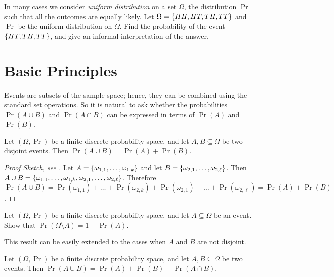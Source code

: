 \begin{exercise}
  In many cases we consider \emph{uniform distribution} on a set $\Omega$, the
  distribution $\Pr$ such that all the outcomes are equally likely.
  Let $\Omega = \set{HH, HT, TH, TT}$ and $\Pr$ be the uniform distribution on
  $\Omega$. Find the probability of the event $\set{HT, TH, TT}$, and give an
  informal interpretation of the answer.
\end{exercise}

\section{Basic Principles}

Events are subsets of the sample space; hence, they can be combined using the
standard set operations. So it is natural to ask whether the probabilities
$\Pr(A \cup B)$ and $\Pr(A \cap B)$ can be expressed in terms of $\Pr(A)$ and
$\Pr(B)$.

\begin{theorem}
  Let $(\Omega, \Pr)$ be a finite discrete probability space, and let $A, B
  \subseteq \Omega$ be two disjoint events. Then 
  $\Pr(A \cup B) = \Pr(A) + \Pr(B)$.
\end{theorem}
\begin{proof}[Proof Sketch, see ]
  Let $A = \set{\omega_{1, 1}, \dots, \omega_{1, k}}$ and 
  let $B = \set{\omega_{2, 1}, \dots, \omega_{2, \ell}}$. 
  Then $A \cup B = \set{\omega_{1, 1}, \dots, \omega_{1, k}, 
    \omega_{2, 1}, \dots, \omega_{2, \ell}}$.
  Therefore $\Pr(A \cup B) = 
    \Pr(\omega_{1, 1}) + \dots + \Pr(\omega_{2, k}) +
    \Pr(\omega_{2, 1}) + \dots + \Pr(\omega_{2, \ell}) = \Pr(A) + \Pr(B)$.
\end{proof}

\begin{exercise}
  Let $(\Omega, \Pr)$ be a finite discrete probability space, and let $A
  \subseteq \Omega$ be an event. Show that $\Pr(\Omega \setminus A) = 1 - \Pr(A)$.
\end{exercise}

This result can be easily extended to the cases when $A$ and $B$ are not
disjoint.
\begin{corollary}
\label{corollary:inclusion-exclusion-probability}
  Let $(\Omega, \Pr)$ be a finite discrete probability space, and let $A, B
  \subseteq \Omega$ be two events. Then 
  $\Pr(A \cup B) = \Pr(A) + \Pr(B) - \Pr(A \cap B)$.
\end{corollary}

